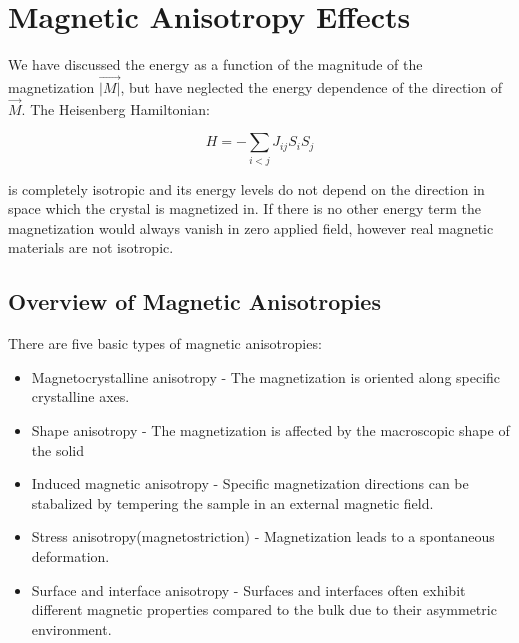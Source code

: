 \documentclass[10pt]{article} %
\begin{document}
\section{Magnetic Anisotropy Effects} %
We have discussed the energy as a function of the magnitude of the magnetization $\vec{|M|}$, but have neglected the energy dependence of the direction of $\vec{M}$. The Heisenberg Hamiltonian:

\begin{equation}
H = - \sum\limits_{i<j} J_{ij}S_iS_j
\end{equation}

is completely isotropic and its energy levels do not depend on the direction in space which the crystal is magnetized in. If there is no other energy term the magnetization would always vanish in zero applied field, however real magnetic materials are not isotropic.

\subsection{Overview of Magnetic Anisotropies} %
There are five basic types of magnetic anisotropies:

\begin{itemize}
\item Magnetocrystalline anisotropy - The magnetization is oriented along specific crystalline axes.
\item Shape anisotropy - The magnetization is affected by the macroscopic shape of the solid
\item Induced magnetic anisotropy - Specific magnetization directions can be stabalized by tempering the sample in an external magnetic field.
\item Stress anisotropy(magnetostriction) - Magnetization leads to a spontaneous deformation.
\item Surface and interface anisotropy - Surfaces and interfaces often exhibit different magnetic properties compared to the bulk due to their asymmetric environment.
\end{itemize}
\end{document}
